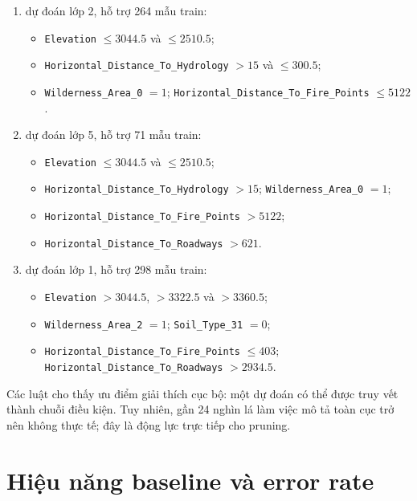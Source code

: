 \begin{enumerate}[leftmargin=*,label=\textbf{Luật \arabic*:}]
    \item dự đoán lớp 2, hỗ trợ 264 mẫu train:
    \begin{itemize}
        \item \texttt{Elevation} $\leq3044.5$ và $\leq2510.5$;
        \item \nolinkurl{Horizontal_Distance_To_Hydrology} $>15$ và $\leq300.5$;
        \item \nolinkurl{Wilderness_Area_0} $=1$; \nolinkurl{Horizontal_Distance_To_Fire_Points} $\leq5122$.
    \end{itemize}

    \item dự đoán lớp 5, hỗ trợ 71 mẫu train:
    \begin{itemize}
        \item \texttt{Elevation} $\leq3044.5$ và $\leq2510.5$;
        \item \nolinkurl{Horizontal_Distance_To_Hydrology} $>15$; \nolinkurl{Wilderness_Area_0} $=1$;
        \item \nolinkurl{Horizontal_Distance_To_Fire_Points} $>5122$;
        \item \nolinkurl{Horizontal_Distance_To_Roadways} $>621$.
    \end{itemize}

    \item dự đoán lớp 1, hỗ trợ 298 mẫu train:
    \begin{itemize}
        \item \texttt{Elevation} $>3044.5$, $>3322.5$ và $>3360.5$;
        \item \nolinkurl{Wilderness_Area_2} $=1$; \nolinkurl{Soil_Type_31} $=0$;
        \item \nolinkurl{Horizontal_Distance_To_Fire_Points} $\leq403$; \nolinkurl{Horizontal_Distance_To_Roadways} $>2934.5$.
    \end{itemize}
\end{enumerate}

Các luật cho thấy ưu điểm giải thích cục bộ: một dự đoán có thể được truy vết thành chuỗi điều kiện. Tuy nhiên, gần 24 nghìn lá làm việc mô tả toàn cục trở nên không thực tế; đây là động lực trực tiếp cho pruning.

\section{Hiệu năng baseline và error rate}

